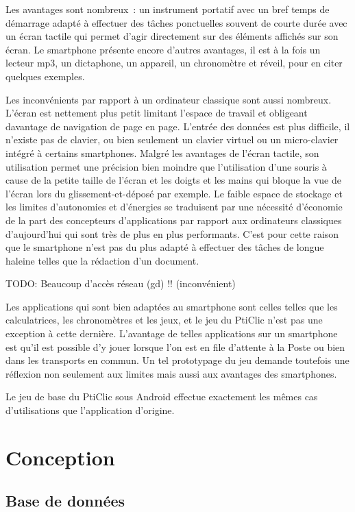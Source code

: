 \documentclass[a4paper,11pt,french]{article}
\begin{document}
Les avantages sont nombreux~: un instrument portatif avec un bref temps de démarrage adapté à effectuer des tâches ponctuelles souvent de courte durée avec un écran tactile qui permet d'agir directement sur des éléments affichés sur son écran. Le smartphone présente encore d'autres avantages, il est à la fois un lecteur mp3, un dictaphone, un appareil, un chronomètre et réveil, pour en citer quelques exemples.

Les inconvénients par rapport à un ordinateur classique sont aussi nombreux. L'écran est nettement plus petit limitant l'espace de travail et obligeant davantage de navigation de page en page. L'entrée des données est plus difficile, il n'existe pas de clavier, ou bien seulement un clavier virtuel ou un micro-clavier intégré à certains smartphones. Malgré les avantages de l'écran tactile, son utilisation permet une précision bien moindre que l'utilisation d'une souris à cause de la petite taille de l'écran et les doigts et les mains qui bloque la vue de l'écran lors du glissement-et-déposé par exemple. Le faible espace de stockage et les limites d'autonomies et d'énergies se traduisent par une nécessité d'économie de la part des concepteurs d'applications par rapport aux ordinateurs classiques d'aujourd'hui qui sont très de plus en plus performants. C'est pour cette raison que le smartphone n'est pas du plus adapté à effectuer des tâches de longue haleine telles que la rédaction d'un document.

TODO: Beaucoup d'accès réseau (gd) !! (inconvénient)

Les applications qui sont bien adaptées au smartphone sont celles telles que les calculatrices, les chronomètres et les jeux, et le jeu du PtiClic n'est pas une exception à cette dernière. L'avantage de telles applications sur un smartphone est qu'il est possible d'y jouer lorsque l'on est en file d'attente à la Poste ou bien dans les transports en commun. Un tel prototypage du jeu demande toutefois une réflexion non seulement aux limites mais aussi aux avantages des smartphones.

Le jeu de base du PtiClic sous Android effectue exactement les mêmes cas d'utilisations que l'application d'origine. 



\section{Conception}


\subsection{Base de données}
\end{document}
